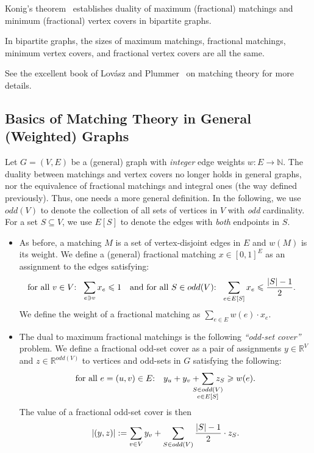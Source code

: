 \documentclass{article}
\renewcommand{\leq}{\leqslant}
\renewcommand{\geq}{\geqslant}
\DeclarePairedDelimiter{\card}{\vert}{\vert}
\newcommand{\IR}{\mathbb{R}}
\newcommand{\IN}{\mathbb{N}}
\begin{document}
Konig's theorem~\cite{Konig1931} establishes duality of maximum (fractional) matchings and minimum (fractional) vertex covers  in bipartite graphs. 
\begin{fact}\label{fact:konig}
In bipartite graphs, the sizes of maximum matchings, fractional matchings, minimum vertex covers, and fractional vertex covers are all the same. 
\end{fact}

See the excellent book of Lov\'asz and Plummer~\cite{LovaszP09} on matching theory for more details. 

\subsection{Basics of Matching Theory in General (Weighted) Graphs}\label{sec:basics-general}

Let $G=(V,E)$ be a (general) graph with \emph{integer} edge weights $w: E \rightarrow \IN$. The duality between matchings and vertex covers no longer holds in general graphs, nor 
the equivalence of fractional matchings and integral ones (the way defined previously). Thus, one needs a more general definition. In the following, we use $odd(V)$ to denote
the collection of all sets of vertices in $V$ with \emph{odd} cardinality. For a set $S \subseteq V$, we use $E[S]$ to denote the edges with \emph{both} endpoints in $S$. 

\begin{itemize}
\item As before, a matching $M$ is a set of vertex-disjoint edges in $E$ and $w(M)$ is its weight. We define a (general) fractional matching $x \in [0,1]^E$ as an assignment to the edges satisfying: 
\begin{alignat*}{2}
	&\text{for all $v \in V$:} ~~\sum_{e \ni v} x_e \leq 1 \quad \text{and for all $S \in odd(V)$:} ~~ \sum_{e \in E[S]} x_e \leq \frac{\card{S}-1}{2}. 
\end{alignat*}
We define the weight of a fractional matching as $\sum_{e \in E} w(e) \cdot x_e$. 

\item The dual to maximum fractional matchings is the following \emph{``odd-set cover''} problem. We define a fractional odd-set cover as a pair of assignments $y \in \IR^V$ and $z \in \IR^{odd(V)}$ to vertices and odd-sets in $G$ 
satisfying the following: 
\begin{align}
	\text{for all $e=(u,v) \in E$:} \quad y_u + y_v + \hspace{-10pt}\sum_{\substack{S \in odd(V) \\ e \in E[S]}} \hspace{-10pt} z_S \geq w(e). \label{eq:fractional-odd-set-cover}
\end{align}
The value of a fractional odd-set cover is then
\[
	\card{(y,z)} := \sum_{v \in V} y_v + \sum_{S \in odd(V)} \frac{\card{S}-1}{2} \cdot z_S. 
\]
\end{itemize}
\end{document}
